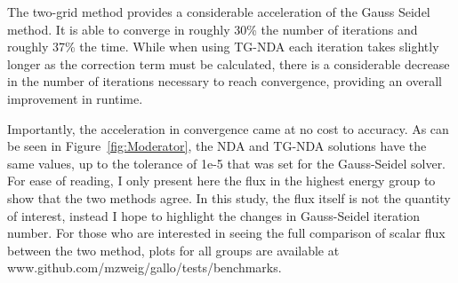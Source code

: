 The two-grid method provides a considerable acceleration of the Gauss Seidel method. It is able to converge in roughly 30\% the number of iterations and roughly 37\% the time. While when using TG-NDA each iteration takes slightly longer as the correction term must be calculated, there is a considerable decrease in the number of iterations necessary to reach convergence, providing an overall improvement in runtime. 

Importantly, the acceleration in convergence came at no cost to accuracy. As can be seen in Figure~\ref{fig:Moderator}, the NDA and TG-NDA solutions have the same values, up to the tolerance of 1e-5 that was set for the Gauss-Seidel solver. For ease of reading, I only present here the flux in the highest energy group to show that the two methods agree.  In this study, the flux itself is not the quantity of interest, instead I hope to highlight the changes in Gauss-Seidel iteration number. For those who are interested in seeing the full comparison of scalar flux between the two method, plots for all groups are available at www.github.com/mzweig/gallo/tests/benchmarks. 
